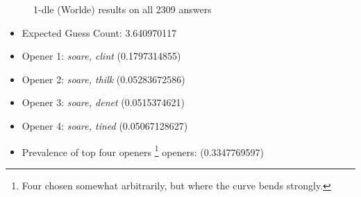 \documentclass[11pt, oneside]{article} 	%
\begin{document}
\begin{figure}%
 \centering
 \qquad
 \caption{1-dle (Worlde) results on all 2309 answers}%
\end{figure}


\begin{itemize}
\item Expected Guess Count: 3.640970117
\item Opener 1: \emph{soare, clint} (0.1797314855)
\item Opener 2: \emph{soare, thilk} (0.05283672586)
\item Opener 3: \emph{soare, denet} (0.0515374621)
\item Opener 4: \emph{soare, tined} (0.05067128627)
\item Prevalence of top four openers \footnote{Four chosen somewhat arbitrarily, but where the curve bends strongly.} openers: (0.3347769597)
\end{itemize}
\end{document}
